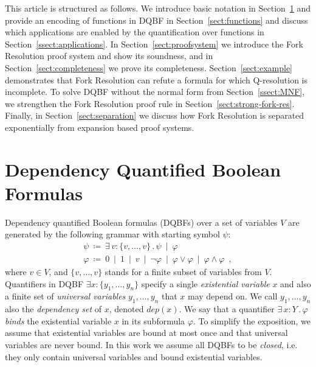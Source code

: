 \documentclass{svjour3}
\newcommand{\ldot}{\mathpunct{.}}
\newcommand{\set}[1]{{\{#1\}}}
\newcommand{\dep}{\mathit{dep}}
\begin{document}
This article is structured as follows. 
We introduce basic notation in Section~\ref{sect:prelim} and provide an encoding of functions in DQBF in Section~\ref{sect:functions} and discuss which applications are enabled by the quantification over functions in Section~\ref{ssect:applications}.
In Section~\ref{sect:proofsystem} we introduce the Fork Resolution proof system and show its soundness, and in Section~\ref{sect:completeness} we prove its completeness.
Section~\ref{sect:example} demonstrates that Fork Resolution can refute a formula for which Q-resolution is incomplete.
To solve DQBF without the normal form from Section~\ref{ssect:MNF}, we strengthen the Fork Resolution proof rule in Section~\ref{sect:strong-fork-res}.
Finally, in Section~\ref{sect:separation} we discuss how Fork Resolution is separated exponentially from expansion based proof systems.


\section{Dependency Quantified Boolean Formulas}
\label{sect:prelim}

Dependency quantified Boolean formulas (DQBFs) over a set of variables $V$ are generated by the following grammar with starting symbol $\psi$: 
\[
\begin{array}{l}
  \psi ~\coloneqq~ \exists\, v : \set{ v,\dots,v} \ldot \psi ~\mid~ \varphi \\
  \varphi ~\coloneqq~ 0 ~\mid~ 1 ~\mid~ v ~\mid~ \neg \varphi ~\mid~ \varphi \lor \varphi ~\mid~ \varphi \land \varphi \enspace,
\end{array}
\]
where $v\in V$, and $\set{v,\dots,v}$ stands for a finite subset of variables from $V$.
Quantifiers in DQBF $\exists x: \set{y_1,\dots,y_n}$ specify a single \emph{existential variable} $x$ and also a finite set of \emph{universal variables} $y_1,\dots,y_n$ that $x$ may depend on. 
We call $y_1,\dots,y_n$ also the \emph{dependency set} of $x$, denoted $\dep(x)$. 
We say that a quantifier $\exists\, x \colon Y \ldot \varphi$ \emph{binds} the existential variable $x$ in its subformula $\varphi$. 
To simplify the exposition, we assume that existential variables are bound at most once and that universal variables are never bound. 
In this work we assume all DQBFs to be \emph{closed}, i.e. they only contain universal variables and bound existential variables.
\end{document}
